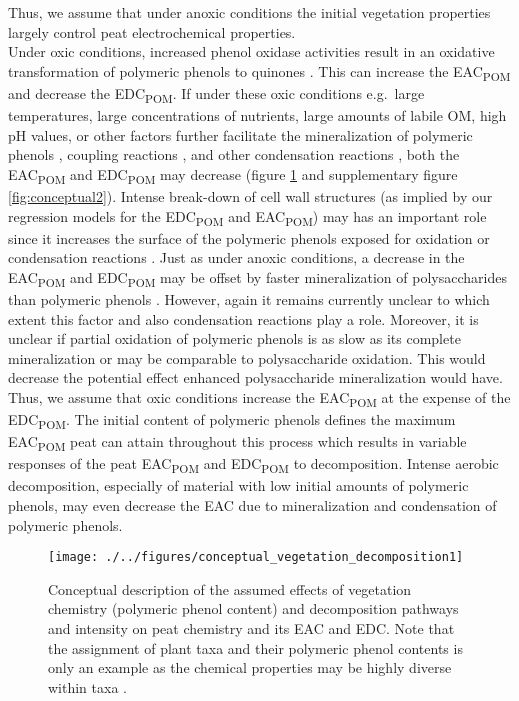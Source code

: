 \documentclass[alpha-refs, lineno]{wiley-article-rmd}
\begin{document}
Thus, we assume that under anoxic conditions the initial vegetation properties largely control peat electrochemical properties.\\
Under oxic conditions, increased phenol oxidase activities result in an oxidative transformation of polymeric phenols to quinones \autocite{Fenner.2011,Schellekens.2015,Bolton.2018}. This can increase the EAC\textsubscript{POM} and decrease the EDC\textsubscript{POM}. If under these oxic conditions e.g.~large temperatures, large concentrations of nutrients, large amounts of labile OM, high pH values, or other factors further facilitate the mineralization of polymeric phenols \autocite{Bragazza.2007,Fenner.2011,Kang.2018c,Bowring.2020}, coupling reactions \autocite{Hotta.2002,Johnson.2015,Bolton.2018,Zhao.2020}, and other condensation reactions \autocite{Bolton.2018,Olk.2006,Heitmann.2006,Yu.2016}, both the EAC\textsubscript{POM} and EDC\textsubscript{POM} may decrease (figure \ref{fig:conceptual1} and supplementary figure \ref{fig:conceptual2}). Intense break-down of cell wall structures (as implied by our regression models for the EDC\textsubscript{POM} and EAC\textsubscript{POM}) may has an important role since it increases the surface of the polymeric phenols exposed for oxidation or condensation reactions \autocite{Tsuneda.2001}. Just as under anoxic conditions, a decrease in the EAC\textsubscript{POM} and EDC\textsubscript{POM} may be offset by faster mineralization of polysaccharides than polymeric phenols \autocite{Benner.1984}. However, again it remains currently unclear to which extent this factor and also condensation reactions play a role. Moreover, it is unclear if partial oxidation of polymeric phenols is as slow as its complete mineralization or may be comparable to polysaccharide oxidation. This would decrease the potential effect enhanced polysaccharide mineralization would have. Thus, we assume that oxic conditions increase the EAC\textsubscript{POM} at the expense of the EDC\textsubscript{POM}. The initial content of polymeric phenols defines the maximum EAC\textsubscript{POM} peat can attain throughout this process which results in variable responses of the peat EAC\textsubscript{POM} and EDC\textsubscript{POM} to decomposition. Intense aerobic decomposition, especially of material with low initial amounts of polymeric phenols, may even decrease the EAC due to mineralization and condensation of polymeric phenols.

\begin{figure}[H]

{\centering \texttt{[image: ./../figures/conceptual\_vegetation\_decomposition1]}

}

\caption{Conceptual description of the assumed effects of vegetation chemistry (polymeric phenol content) and decomposition pathways and intensity on peat chemistry and its EAC and EDC. Note that the assignment of plant taxa and their polymeric phenol contents is only an example as the chemical properties may be highly diverse within taxa \autocite{Bengtsson.2018}.}\label{fig:conceptual1}
\end{figure}
\end{document}
